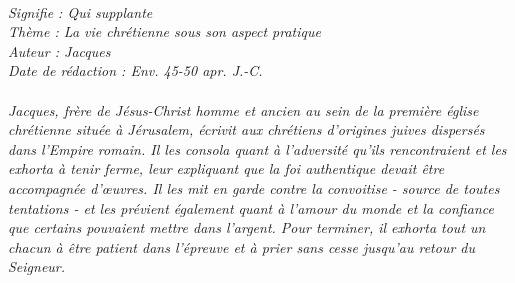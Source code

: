 \BFont
\noindent\hrulefill
\textit{
\bigskip
{\centering{}
\\Signifie : Qui supplante
\\Thème : La vie chrétienne sous son aspect pratique
\\Auteur : Jacques
\\Date de rédaction : Env. 45-50 apr. J.-C.\\}
}
\textit{
\\Jacques, frère de Jésus-Christ homme et ancien au sein de la première église chrétienne située à Jérusalem, écrivit aux chrétiens d’origines juives dispersés dans l’Empire romain. Il les consola quant à l’adversité qu’ils rencontraient et les exhorta à tenir ferme, leur expliquant que la foi authentique devait être accompagnée d’œuvres. Il les mit en garde contre la convoitise - source de toutes tentations - et les prévient également quant à l’amour du monde et la confiance que certains pouvaient mettre dans l’argent. Pour terminer, il exhorta tout un chacun à être patient dans l’épreuve et à prier sans cesse jusqu’au retour du Seigneur.\bigskip
}
\par\nobreak\noindent\hrulefill
